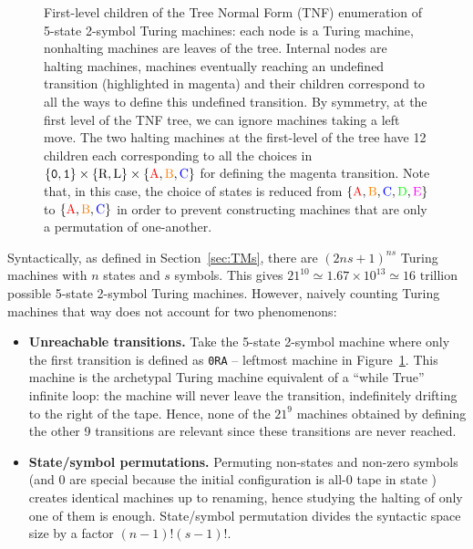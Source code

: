 \begin{figure}[ht]
{\begin{tikzpicture}
        \end{tikzpicture}
    }
    \caption{First-level children of the Tree Normal Form (TNF) enumeration of 5-state 2-symbol Turing machines: each node is a Turing machine, nonhalting machines are leaves of the tree. Internal nodes are halting machines, \ie machines eventually reaching an undefined transition (highlighted in magenta) and their children correspond to all the ways to define this undefined transition. By symmetry, at the first level of the TNF tree, we can ignore machines taking a left move. The two halting machines at the first-level of the tree have 12 children each corresponding to all the choices in $\{\szero,\sone\}\times\{\text{R},\text{L}\}\times\{\text{\stateA},\text{\stateB},\text{\stateC}\}$ for defining the magenta transition. Note that, in this case, the choice of states is reduced from $\{\text{\stateA},\text{\stateB},\text{\stateC},\text{\stateD},\text{\stateE}\}$ to $\{\text{\stateA},\text{\stateB},\text{\stateC}\}$ in order to prevent constructing machines that are only a permutation of one-another.}\label{fig:TNF}
\end{figure}



Syntactically, as defined in Section~\ref{sec:TMs}, there are $(2ns + 1)^{ns}$ Turing machines with $n$ states and $s$ symbols. This gives $21^{10} \simeq 1.67\times10^{13} \simeq 16 \text{ trillion}$ possible 5-state 2-symbol Turing machines. However, naively counting Turing machines that way does not account for two phenomenons:
\begin{itemize}
    \item \textbf{Unreachable transitions.} Take the 5-state 2-symbol machine where only the first transition is defined as \texttt{0RA} -- leftmost machine in Figure~\ref{fig:TNF}. This machine is the archetypal Turing machine equivalent of a ``while True'' infinite loop: the machine will never leave the transition, indefinitely drifting to the right of the tape. Hence, none of the $21^9$ machines obtained by defining the other 9 transitions are relevant since these transitions are never reached.
    \item \textbf{State/symbol permutations.} Permuting non-\stateA states and non-zero symbols (\stateA and 0 are special because the initial configuration is all-0 tape in state \stateA) creates identical machines up to renaming, hence studying the halting of only one of them is enough. State/symbol permutation divides the syntactic space size by a factor $(n-1)! (s-1)!$.
\end{itemize}

